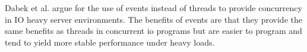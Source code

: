 Dabek et al. argue for the use of events instead of threads to provide concurrency in IO heavy server environments. The benefits of events are that they provide the same benefits as threads in concurrent io programs but are easier to program and tend to yield more stable performance under heavy loads.~\cite{dabek2002event}

%
%
%
%
%
%
%
%
%
%
